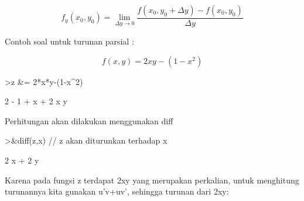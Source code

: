 \documentclass[a4paper,10pt]{article}
\begin{document}
\begin{eulernotebook}
\begin{eulercomment}
\begin{eulercomment}
\begin{eulercomment}
\begin{eulercomment}
\begin{eulercomment}
\begin{eulercomment}
\begin{eulercomment}
\begin{eulercomment}
\begin{eulercomment}
\begin{eulercomment}
\begin{eulercomment}
\begin{eulercomment}
\begin{eulercomment}
\begin{eulercomment}
\begin{eulercomment}
\begin{eulercomment}
\begin{eulercomment}
\begin{eulercomment}
\begin{eulercomment}
\begin{eulercomment}
\begin{eulercomment}
\begin{eulercomment}
\begin{eulercomment}
\begin{eulercomment}
\begin{eulercomment}
\begin{eulercomment}
\begin{eulercomment}
\begin{eulercomment}
\begin{eulercomment}
\begin{eulercomment}
\begin{eulercomment}
\end{eulercomment}
\begin{eulerformula}
\[
f_y(x_0,y_0)= \lim_{\Delta y \to 0} \frac{f(x_0, y_0+\Delta y)-f(x_0,y_0)}{\Delta y}
\]
\end{eulerformula}
\begin{eulercomment}
Contoh soal untuk turunan parsial :

\end{eulercomment}
\begin{eulerformula}
\[
f(x,y)=2xy-(1-x^2)
\]
\end{eulerformula}
\begin{eulerprompt}
>z &= 2*x*y-(1-x^2)
\end{eulerprompt}
\begin{euleroutput}
  
                                    2
                             - 1 + x  + 2 x y
  
\end{euleroutput}
\begin{eulercomment}
Perhitungan akan dilakukan menggunakan diff
\end{eulercomment}
\begin{eulerprompt}
>&diff(z,x) // z akan diturunkan terhadap x
\end{eulerprompt}
\begin{euleroutput}
  
                                2 x + 2 y
  
\end{euleroutput}
\begin{eulercomment}
Karena pada fungsi z terdapat 2xy yang merupakan perkalian, untuk
menghitung turunannya kita gunakan u'v+uv', sehingga turunan dari 2xy:


\end{eulercomment}
\end{eulercomment}
\end{eulercomment}
\end{eulercomment}
\end{eulercomment}
\end{eulercomment}
\end{eulercomment}
\end{eulercomment}
\end{eulercomment}
\end{eulercomment}
\end{eulercomment}
\end{eulercomment}
\end{eulercomment}
\end{eulercomment}
\end{eulercomment}
\end{eulercomment}
\end{eulercomment}
\end{eulercomment}
\end{eulercomment}
\end{eulercomment}
\end{eulercomment}
\end{eulercomment}
\end{eulercomment}
\end{eulercomment}
\end{eulercomment}
\end{eulercomment}
\end{eulercomment}
\end{eulercomment}
\end{eulercomment}
\end{eulercomment}
\end{eulercomment}
\end{eulernotebook}
\end{document}
